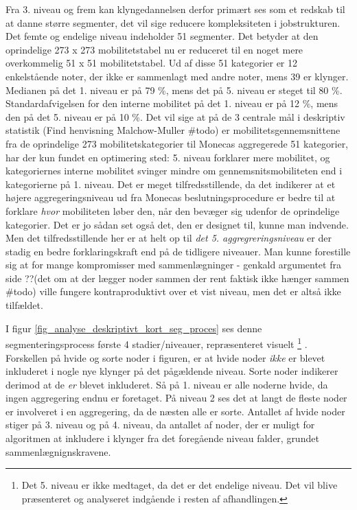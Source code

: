 Fra 3. niveau og frem kan klyngedannelsen derfor primært ses som et redskab til at danne større segmenter, det vil sige reducere kompleksiteten i jobstrukturen. Det femte og endelige niveau indeholder 51 segmenter. Det betyder at den oprindelige 273 x 273 mobilitetstabel nu er reduceret til en noget mere overkommelig 51 x 51 mobilitetstabel. Ud af disse 51 kategorier er 12 enkelstående noter, der ikke er sammenlagt med andre noter, mens 39 er klynger. Medianen på det 1. niveau er på 79 \%, mens det på 5. niveau er steget til 80 \%. Standardafvigelsen for den interne mobilitet på det 1. niveau er på 12 \%, mens den på det 5. niveau er på 10 \%. Det vil sige at på de 3 centrale mål i deskriptiv statistik (Find henvisning Malchow-Muller \#todo) er mobilitetsgennemsnittene fra de oprindelige 273 mobilitetskategorier til Monecas aggregerede 51 kategorier, har der kun fundet en optimering sted: 5. niveau forklarer mere mobilitet, og kategoriernes interne mobilitet svinger mindre om gennemsnitsmobiliteten end i kategorierne på 1. niveau. Det er meget tilfredsstillende, da det indikerer at et højere aggregeringsniveau ud fra Monecas beslutningsprocedure er bedre til at forklare \emph{hvor} mobiliteten løber den, når den bevæger sig udenfor de oprindelige kategorier. Det er jo sådan set også det, den er designet til, kunne man indvende. Men det tilfredsstillende her er at helt op til \emph{det 5. aggregreringsniveau} er der stadig en bedre forklaringskraft end på de tidligere niveauer. Man kunne forestille sig at for mange kompromisser med sammenlægninger - genkald argumentet fra side ??(det om at der lægger noder sammen der rent faktisk ikke hænger sammen \#todo) ville fungere kontraproduktivt over et vist niveau, men det er altså ikke tilfældet. %

I figur \ref{fig_analyse_deskriptivt_kort_seg_proces} ses denne segmenteringsprocess første 4 stadier/niveauer, repræsenteret visuelt%
%
\footnote{Det 5. niveau er ikke medtaget, da det er det endelige niveau. Det vil blive præsenteret og analyseret indgående i resten af afhandlingen.}%
%
. Forskellen på hvide og sorte noder i figuren, er at hvide noder \emph{ikke} er blevet inkluderet i nogle nye klynger på det pågældende niveau. Sorte noder indikerer derimod at de \emph{er} blevet inkluderet. Så på 1. niveau er alle noderne hvide, da ingen aggregering endnu er foretaget. På niveau 2 ses det at langt de fleste noder er involveret i en aggregering, da de næsten alle er sorte. Antallet af hvide noder stiger på 3. niveau og på 4. niveau, da antallet af noder, der er muligt for algoritmen at inkludere i klynger fra det foregående niveau falder, grundet sammenlægnignskravene.   

